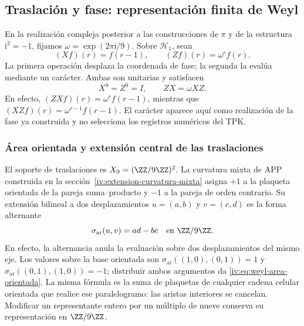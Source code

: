 

\subsection{Traslación y fase: representación finita de Weyl}

En la realización compleja posterior a las construcciones de
\(\pi\) y de la estructura \(\mathrm i^2=-1\), fijamos
\(\omega=\exp(2\pi\mathrm i/9)\). Sobre \(\mathcal H_1\), sean
\begin{equation}
 (Xf)(r)=f(r-1),\qquad (Zf)(r)=\omega^r f(r).
 \label{iv:eq:weyl-operadores}
\end{equation}
La primera operación desplaza la coordenada de fase; la segunda la
evalúa mediante un carácter. Ambas son unitarias y satisfacen
\begin{equation}
 X^9=Z^9=I,\qquad ZX=\omega XZ.
 \label{iv:eq:weyl-relacion}
\end{equation}
En efecto, \((ZXf)(r)=\omega^r f(r-1)\), mientras que
\((XZf)(r)=\omega^{r-1}f(r-1)\). El carácter aparece aquí como
realización de la fase ya construida y no selecciona los registros
numéricos del TPK.

\subsubsection{Área orientada y extensión central de las traslaciones}
\label{iv:weyl-area-extension}

El soporte de traslaciones es \(X_9=(\ZZ/9\ZZ)^2\).
La curvatura mixta de APP construida en la
sección~\ref{iv:extension-curvatura-mixta} asigna \(+1\) a la
plaqueta orientada de la pareja suma--producto y \(-1\) a la
pareja de orden contrario. Su extensión bilineal a dos desplazamientos
\(u=(a,b)\) y \(v=(c,d)\) es la forma alternante
\begin{equation}
 \sigma_{\mathrm{ar}}(u,v)=ad-bc\quad\text{en }\ZZ/9\ZZ.
 \label{iv:eq:weyl-area-orientada}
\end{equation}
En efecto, la alternancia anula la evaluación sobre dos desplazamientos
del mismo eje. Los valores sobre la base orientada son
\(\sigma_{\mathrm{ar}}((1,0),(0,1))=1\) y
\(\sigma_{\mathrm{ar}}((0,1),(1,0))=-1\); distribuir ambos
argumentos da \eqref{iv:eq:weyl-area-orientada}. La misma fórmula es
la suma de plaquetas de cualquier cadena celular orientada que realice
ese paralelogramo: las aristas interiores se cancelan. Modificar un
representante entero por un múltiplo de nueve conserva su representación
en \(\ZZ/9\ZZ\).


